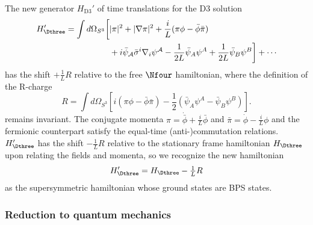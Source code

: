 \documentclass[a4paper,12pt]{article}
\begin{document}
The new generator $H_{\mathrm{D3}}'$ of time translations for the D3 solution
\begin{align} \label{eq:newhamiltonian}
    H_{\Dthree}' = \int d\Omega_{S^3} \bigg[ &|\pi|^2 + |\nabla\pi|^2 + \frac{i}{L} ( \pi \phi - \bar\phi \bar\pi ) \nonumber \\
    &+i \bar\psi_{\mathcal{A}} \bar\sigma^i \nabla_i \psi^{\mathcal{A}} - \frac{1}{2L} \bar\psi_A \psi^A + \frac{1}{2L} \bar\psi_B \psi^B  \bigg] + \cdots
\end{align}
has the shift $+\frac{1}{L}R$ relative to the free $\Nfour$ hamiltonian, where the definition of the R-charge
\begin{equation}
R = \int d\Omega_{S^3} \left[ i ( \pi \phi - \bar\phi \bar\pi ) - \frac{1}{2} (\bar\psi_A \psi^A - \bar\psi_B \psi^B)  \right ].
\end{equation}
remains invariant. The conjugate momenta $\pi = \dot{\bar{\phi}} + \frac{i}{L} \bar\phi$ and $\bar\pi = \dot{\phi} - \frac{i}{L} \phi$ and the fermionic counterpart satisfy the equal-time (anti-)commutation relations. $H_\Dthree'$ has the shift $-\frac{1}{L}R$ relative to the stationary frame hamiltonian $H_\Dthree$ upon relating the fields and momenta, so we recognize the new hamiltonian
\begin{equation}
H_\Dthree' = H_\Dthree - \tfrac{1}{L} R
\end{equation}
as the supersymmetric hamiltonian whose ground states are BPS states.

\subsubsection{Reduction to quantum mechanics} \label{subsubsec:quantummechanics}
\end{document}

